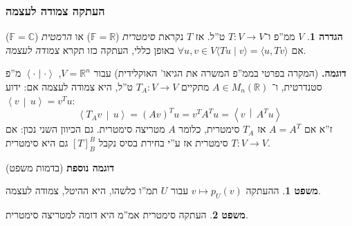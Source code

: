 \documentclass[a4paper]{article}
\newcommand\R     {\mathbb{R}}
\newcommand\C     {\mathbb{C}}
\newcommand\ra    {\rangle}
\newcommand\la    {\langle}
\newcommand\F         {\mathbb{F}}
\newcommand\co        {\colon}
\newcommand\smut      {\left \la \cdot \mid \cdot \right \ra}
\newcommand\mut [2]   {\left \la #1 \,\middle|\, #2 \right \ra}
\theoremstyle{definition}
\newtheorem{Theorem}{\color{myblue}משפט}
\newtheorem{Definition}{\color{mygreen}הגדרה}
\newcommand\theo  [1] {\begin{Theorem}#1\end{Theorem}}
\newcommand\defi  [1] {\begin{Definition}#1\end{Definition}}
\begin{document}
	\subsubsection{העתקה צמודה לעצמה}
	
	\defi{$V$ ממ''פ ו־$T \co V \to V$ ט''ל. אז $T$ נקראת \textit{סימטרית} ($\F = \R$) או \textit{הרמטית} ($\F = \C$) אם $\forall u, v \in V\la Tu \mid v \ra = \la u, Tv \ra$
		באופן כללי, העתקה כזו תקרא \textit{צמודה לעצמה}. }
	
	\textbf{דוגמה. }(המקרה בפרטי בממ''פ המשרה את הגיאו' האוקלידית) עבור $V = \R^{n}$, $\smut$ מ''פ סטנדרטית, ו־ $A \in M_n(\R)$ מתקיים $T_A \co V \to V$ ט''ל, היא צמודה לעצמה אם: ידוע $\mut{v}{u} = v^{T}u$: 
	\[ \mut{T_Av}{u} = (Av)^{T}u = v^{T}A^Tu = \mut{v}{A^{T}u} \]
	ז''א אם $A = A^{T}$ אז $T_A$ סימטרית, כלומר $A$ מטריצה סימטרית. גם הכיוון השני נכון: אם $T \co V \to V$ סימטרית אז ע''י בחירת בסיס נקבל $[T]^{B}_B$ גם היא סימטרית. 
	
	\textbf{דוגמה נוספת} (בדמות משפט)
	\theo{ההעתקה $v \mapsto p_U(v)$ עבור $U$ תמ''ו כלשהו, היא ההיטל, צמודה לעצמה. }
	
	\theo{העתקה סימטרית אמ''מ היא דומה למטריצה סימטרית. }
	
\end{document}
